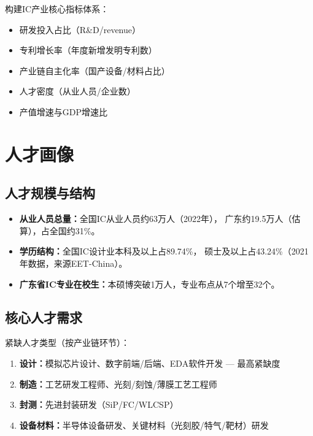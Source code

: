 \documentclass[12pt,a4paper]{ctexart}
\begin{document}
构建IC产业核心指标体系：
\begin{itemize}
    \item 研发投入占比（R\&D/revenue）
    \item 专利增长率（年度新增发明专利数）
    \item 产业链自主化率（国产设备/材料占比）
    \item 人才密度（从业人员/企业数）
    \item 产值增速与GDP增速比
\end{itemize}

\section{人才画像}
\label{sec:talent}

\subsection{人才规模与结构}
\label{sec:talent_scale}

\begin{itemize}
    \item \textbf{从业人员总量：}全国IC从业人员约63万人（2022年），
          广东约19.5万人（估算），占全国约31\%。
    \item \textbf{学历结构：}全国IC设计业本科及以上占89.74\%，
          硕士及以上占43.24\%（2021年数据，来源EET-China）。
    \item \textbf{广东省IC专业在校生：}本硕博突破1万人，专业布点从7个增至32个。
\end{itemize}

\subsection{核心人才需求}
\label{sec:talent_demand}

紧缺人才类型（按产业链环节）：
\begin{enumerate}[label=(\arabic*)]
    \item \textbf{设计：}模拟芯片设计、数字前端/后端、EDA软件开发 — 最高紧缺度
    \item \textbf{制造：}工艺研发工程师、光刻/刻蚀/薄膜工艺工程师
    \item \textbf{封测：}先进封装研发（SiP/FC/WLCSP）
    \item \textbf{设备材料：}半导体设备研发、关键材料（光刻胶/特气/靶材）研发
\end{enumerate}
\end{document}
